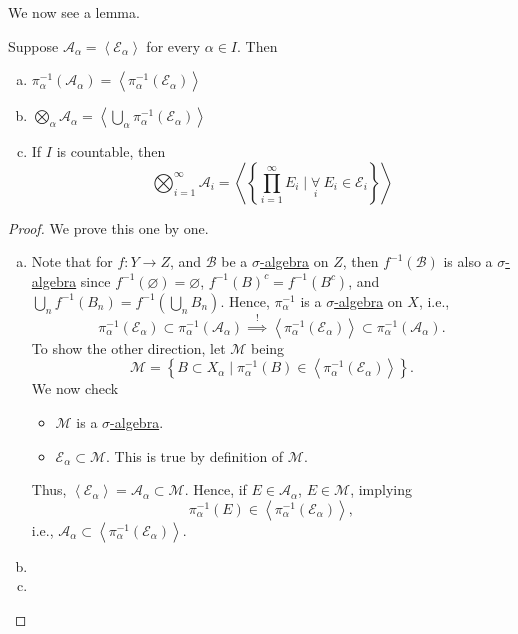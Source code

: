 We now see a lemma.
\begin{lemma}
	Suppose \(\mathcal{A} _\alpha  = \left< \mathcal{E} _\alpha  \right> \) for every \(\alpha \in I\). Then
	\begin{enumerate}[(a)]
		\item \(\pi _\alpha ^{-1} (\mathcal{A} _\alpha ) = \left< \pi ^{-1} _\alpha (\mathcal{E} _\alpha ) \right> \)
		\item \(\bigotimes_\alpha  \mathcal{A} _\alpha = \left< \bigcup_{\alpha} \pi _\alpha ^{-1} (\mathcal{E} _\alpha )\right> \)
		\item If \(I\) is countable, then
		      \[
			      \bigotimes_{i=1}^{\infty }\mathcal{A} _i = \left< \left\{\prod_{i=1}^{\infty} E_{i} \mid \underset{i}{\forall}\ E_{i}\in \mathcal{E} _{i}\right\} \right>
		      \]
	\end{enumerate}
\end{lemma}
\begin{proof}
	We prove this one by one.
	\begin{enumerate}[(a)]
		\item Note that for \(f\colon Y\to Z\), and \(\mathcal{B} \) be a \hyperref[def:sigma-algebra]{\(\sigma\)-algebra} on \(Z\), then
		      \(f^{-1} (\mathcal{B} )\) is also a \hyperref[def:sigma-algebra]{\(\sigma\)-algebra} since
		      \(f^{-1} (\varnothing ) = \varnothing\), \(f^{-1} (B)^{c} = f^{-1} (B^{c} )\), and \(\bigcup_{n} f^{-1} (B_{n}) = f^{-1} (\bigcup_{n}B_{n})\).
		      Hence, \(\pi ^{-1}_\alpha \) is a \hyperref[def:sigma-algebra]{\(\sigma\)-algebra} on \(X\), i.e.,
		      \[
			      \pi _\alpha ^{-1} (\mathcal{E} _\alpha )\subset \pi _\alpha ^{-1} (\mathcal{A} _\alpha )\overset{\hyperref[lma:lec2-1]{!}}{\implies} \left< \pi ^{-1} _\alpha (\mathcal{E} _\alpha ) \right> \subset \pi _\alpha ^{-1} (\mathcal{A} _\alpha ).
		      \]
		      To show the other direction, let \(\mathcal{M} \) being
		      \[
			      \mathcal{M} = \left\{B\subset X_\alpha  \mid \pi _\alpha ^{-1} (B)\in \left< \pi _\alpha ^{-1} (\mathcal{E} _\alpha ) \right> \right\}.
		      \]
		      We now check
		      \begin{itemize}
			      \item \(\mathcal{M} \) is a \hyperref[def:sigma-algebra]{\(\sigma\)-algebra}. 
			      \item \(\mathcal{E} _\alpha \subset \mathcal{M}\). This is true by definition of \(\mathcal{M} \).
		      \end{itemize}
		      Thus, \(\left< \mathcal{E} _\alpha \right> = \mathcal{A} _\alpha \subset \mathcal{M} \). Hence,
		      if \(E\in \mathcal{A} _\alpha \), \(E\in \mathcal{M} \), implying
		      \[
			      \pi _\alpha ^{-1} (E)\in \left< \pi _\alpha ^{-1} (\mathcal{E} _\alpha ) \right>,
		      \]
		      i.e., \(\mathcal{A} _\alpha \subset \left< \pi_\alpha ^{-1} (\mathcal{E} _\alpha ) \right> \).
		\item {}
		\item {}
	\end{enumerate}
\end{proof}

